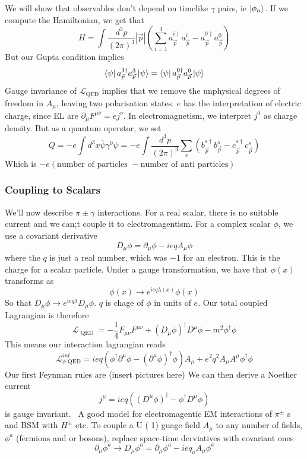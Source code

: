 We will show that observables don't depend on timelike 
$ \gamma $ pairs, ie $ \ket{ \phi _ n } $. 
If we compute the Hamiltonian, we 
get that 
\[
	H = \int \frac{d ^ 3p  }{( 2 \pi )^{ 3 }  } | \vec{p} | \left( 
	\sum _{ i =  1 } ^ 3 a_{ \vec{p} } ^{ i \dagger } a_{\vec{p} } ^ i - a _{ \vec{p} } ^{ 0 \dagger } 
a _{ \vec{p} } ^ 0 \right)  
\] But our Gupta condition implies 
\[
 \bra{ \psi }a_{\vec{p} } ^{ 3 \dagger } a_{\vec{p} } ^ 3 \ket{ \psi }  = 
 \bra{ \psi }a_{\vec{p} } ^{ 0 \dagger } a _{ \vec{p} } ^ 0 \ket{ \psi } 
\]
Gauge invariance of $\mathcal{ L } _{ \text{QED} } $ implies that 
we remove the unphysical degrees of freedom in $ A _ \mu $, 
leaving two polarisation states. $ e $ has the interpretation of 
electric charge, since EL are $ \partial  _ \mu F ^{ \mu \nu}  = e j ^ \nu $. 
In electromagnetism, we interpret $ j ^ 0 $ as charge density. 
But as a quantum operstor, we set 
\[
 Q =  - e \int d ^ 3 x \overline{ \psi } \gamma ^ 0 \psi =  - e 
 \int \frac{ d ^ 3 p }{ \left( 2 \pi  \right)  ^ 3 } \sum_{ s } \left( 
 b _{ \vec{p} } ^{ s \dagger } b _{ \vec{p} } ^ s - c _{\vec{p} } ^{ s\dagger } c _{\vec{p} } ^ s \right) 
\] Which is $ - e \left( \text{number of particles }  - \text{number of anti particles} \right) $ 

\subsubsection{Coupling to Scalars} 
We'll now describe $ \pi \pm \gamma $ interactions.
For a real scalar, there is no suitable current and we can;t couple it to electromagentism. 
For a complex scalar $ \phi $, we use a covariant derivative 
\[
D _ \mu \phi = \partial  _ \mu \phi  - i e q A _ \mu \phi  
\] where the $ q $ is just a real number, which was $ - 1$ for an electron. 
This is the charge for a scalar particle. 
Under a gauge transformation, we have that $ \phi ( x) $ 
transforms as 
\[
	\phi ( x) \to e ^{ i e q \lambda ( x) } \phi ( x) 
\] So that $ D_ \mu \phi \to e ^{ i e q \lambda }  D_ \mu \phi $.
$ q $ is chage of $ \phi $ in units of $ e $. 
Our total coupled Lagrangian is 
therefore 
\[
	\mathcal{ L } _{ \text{ QED } }  = -\frac{1}{4 } F_{ \mu \nu }F ^{ \mu \nu }  +  \left( D _ \mu \phi \right)  ^{ \dagger } D ^ \mu \phi - m ^ 2 \phi ^ \dagger \phi  
\]
This means our interaction lagrangian reads 
\[
\mathcal{ L } _{ \phi \text{ QED} } ^{ int } = i e q
\left( \phi ^ \dagger \partial ^ \mu \phi  - \left( \partial  ^ \mu \phi  \right)  ^ \dagger 
\phi \right) A_ \mu + e ^ 2 q ^ 2 A _ \mu A ^ \mu \phi ^ \dagger \phi   
\]  Our first Feynman rules 
are (insert pictures here)
We can then derive a Noether current 
\[
	j ^ \mu  = i  eq \left( \left(  D^ \mu \phi  \right)  ^ \dagger  - \phi ^ \dagger D ^ \mu \phi  \right)  
\] is gauge invariant. 
A good model for electromagentic EM interactions of $ \pi ^{ \pm } $  
s and BSM with $ H ^{ \pm } $ etc. 
To couple a U ( 1) guage field $A _ \mu $ to any number of fields, 
$ \phi ^ a $ (fermions and or bosons), replace space-time derviatives with 
covariant ones 
\[
 \partial  _ \mu \phi ^ a \to D _ \mu \phi ^ a  = 
 \partial  _ \mu \phi ^ a  - ieq _ a A _ \mu \phi ^ a 
\]

